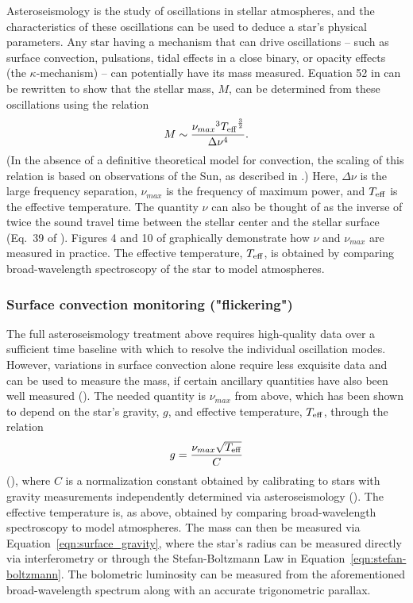 \documentclass[twocolumn,tighten,twocolappendix]{aastex631}
\begin{document}
Asteroseismology is the study of oscillations in stellar atmospheres, and the characteristics of these oscillations can be used to deduce a star's physical parameters. Any star having a mechanism that can drive oscillations -- such as surface convection, pulsations, tidal effects in a close binary, or opacity effects (the $\kappa$-mechanism) -- can potentially have its mass measured. Equation 52 in \cite{aerts2021} can be rewritten to show that the stellar mass, $M$, can be determined from these oscillations using the relation 
\begin{equation}
    M \sim \frac{{\nu_{max}}^3{T_{\rm eff}}^{\frac{3}{2}}}{\Delta\nu^{4}}.
\end{equation} 
(In the absence of a definitive theoretical model for convection, the scaling of this relation is based on observations of the Sun, as described in \citealt{kjeldsen1995}.) Here, $\Delta{\nu}$ is the large frequency separation, $\nu_{max}$ is the frequency of maximum power, and ${T_{\rm eff}}$ is the effective temperature.  The quantity $\nu$ can also be thought of as the inverse of twice the sound travel time between the stellar center and the stellar surface (Eq.\ 39 of \citealt{aerts2021}). Figures 4 and 10 of \cite{aerts2021} graphically demonstrate how $\nu$ and $\nu_{max}$ are measured in practice. The effective temperature, ${T_{\rm eff}}$, is obtained by comparing broad-wavelength spectroscopy of the star to model atmospheres. 

\subsubsection{Surface convection monitoring ("flickering")}

The full asteroseismology treatment above requires high-quality data over a sufficient time baseline with which to resolve the individual oscillation modes. However, variations in surface convection alone require less exquisite data and can be used to measure the mass, if certain ancillary quantities have also been well measured (\citealt{stassun2018}). The needed quantity is $\nu_{max}$ from above, which has been shown to depend on the star's gravity, $g$, and effective temperature, $T_{\rm eff}$, through the relation 
\begin{equation}
    g = \frac{\nu_{max}\sqrt{T_{\rm eff}}}{{C}} 
\end{equation}
(\citealt{brown1991}), where $C$ is a normalization constant obtained by calibrating to stars with gravity measurements independently determined via asteroseismology (\citealt{kallinger2016}). 
The effective temperature is, as above, obtained by comparing broad-wavelength spectroscopy to model atmospheres. The mass can then be measured via Equation~\ref{eqn:surface_gravity}, where the star's radius can be measured directly via interferometry or through the Stefan-Boltzmann Law in Equation~\ref{eqn:stefan-boltzmann}. The bolometric luminosity can be measured from the aforementioned broad-wavelength spectrum along with an accurate trigonometric parallax.
\end{document}
